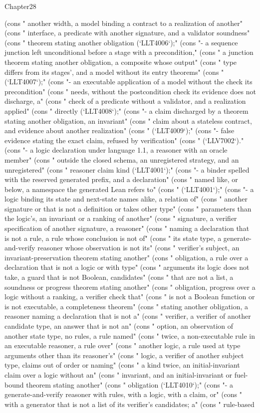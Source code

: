 \begin{lexlean}{Chapter28}
\begin{semanticmodule}
{{      (cons "  another width, a model binding a contract to a realization of another" (cons "  interface, a predicate with another signature, and a validator soundness" (cons "  theorem stating another obligation (`LLT4006`);" (cons "- a sequence junction left unconditional before a stage with a precondition," (cons "  a junction theorem stating another obligation, a composite whose output" (cons "  type differs from its stages', and a model without its entry theorems" (cons "  (`LLT4007`);" (cons "- an executable application of a model without the check its precondition" (cons "  needs, without the postcondition check its evidence does not discharge, a" (cons "  check of a predicate without a validator, and a realization applied" (cons "  directly (`LLT4008`);" (cons "- a claim discharged by a theorem stating another obligation, an invariant" (cons "  claim about a stateless contract, and evidence about another realization" (cons "  (`LLT4009`);" (cons "- false evidence stating the exact claim, refused by verification" (cons "  (`LLV7002`)." (cons "- a logic declaration under language 1.1, a reasoner with an oracle member" (cons "  outside the closed schema, an unregistered strategy, and an unregistered" (cons "  reasoner claim kind (`LLT4001`);" (cons "- a binder spelled with the reserved generated prefix, and a declaration" (cons "  named like, or below, a namespace the generated Lean refers to" (cons "  (`LLT4001`);" (cons "- a logic binding its state and next-state names alike, a relation of" (cons "  another signature or that is not a definition or takes other type" (cons "  parameters than the logic's, an invariant or a ranking of another" (cons "  signature, a verifier specification of another signature, a reasoner" (cons "  naming a declaration that is not a rule, a rule whose conclusion is not of" (cons "  its state type, a generate-and-verify reasoner whose observation is not its" (cons "  verifier's subject, an invariant-preservation theorem stating another" (cons "  obligation, a rule over a declaration that is not a logic or with type" (cons "  arguments its logic does not take, a guard that is not Boolean, candidates" (cons "  that are not a list, a soundness or progress theorem stating another" (cons "  obligation, progress over a logic without a ranking, a verifier check that" (cons "  is not a Boolean function or is not executable, a completeness theorem" (cons "  stating another obligation, a reasoner naming a declaration that is not a" (cons "  verifier, a verifier of another candidate type, an answer that is not an" (cons "  option, an observation of another state type, no rules, a rule named" (cons "  twice, a non-executable rule in an executable reasoner, a rule over" (cons "  another logic, a rule used at type arguments other than its reasoner's" (cons "  logic, a verifier of another subject type, claims out of order or naming" (cons "  a kind twice, an initial-invariant claim over a logic without an" (cons "  invariant, and an initial-invariant or fuel-bound theorem stating another" (cons "  obligation (`LLT4010`);" (cons "- a generate-and-verify reasoner with rules, with a logic, with a claim, or" (cons "  with a generator that is not a list of its verifier's candidates; a" (cons "  rule-based }}
\end{semanticmodule}
\end{lexlean}

